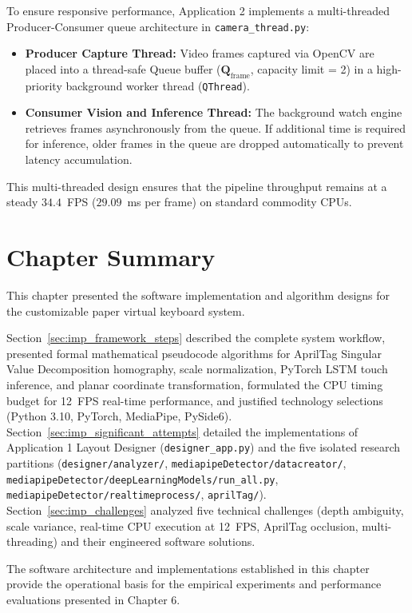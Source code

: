 To ensure responsive performance, Application 2 implements a multi-threaded Producer-Consumer queue architecture in \texttt{camera\_thread.py}:
\begin{itemize}
    \item \textbf{Producer Capture Thread:} Video frames captured via OpenCV are placed into a thread-safe Queue buffer ($\mathbf{Q}_{\text{frame}}$, capacity limit = 2) in a high-priority background worker thread (\texttt{QThread}).
    \item \textbf{Consumer Vision and Inference Thread:} The background watch engine retrieves frames asynchronously from the queue. If additional time is required for inference, older frames in the queue are dropped automatically to prevent latency accumulation.
\end{itemize}

This multi-threaded design ensures that the pipeline throughput remains at a steady $34.4$~FPS ($29.09$~ms per frame) on standard commodity CPUs.

\section{Chapter Summary}
\label{sec:imp_summary}
This chapter presented the software implementation and algorithm designs for the customizable paper virtual keyboard system.

Section~\ref{sec:imp_framework_steps} described the complete system workflow, presented formal mathematical pseudocode algorithms for AprilTag Singular Value Decomposition homography, scale normalization, PyTorch LSTM touch inference, and planar coordinate transformation, formulated the CPU timing budget for 12~FPS real-time performance, and justified technology selections (Python 3.10, PyTorch, MediaPipe, PySide6). Section~\ref{sec:imp_significant_attempts} detailed the implementations of Application 1 Layout Designer (\texttt{designer\_app.py}) and the five isolated research partitions (\texttt{designer/analyzer/}, \texttt{mediapipeDetector/datacreator/}, \texttt{mediapipeDetector/deepLearningModels/run\_all.py}, \texttt{mediapipeDetector/realtimeprocess/}, \texttt{aprilTag/}). Section~\ref{sec:imp_challenges} analyzed five technical challenges (depth ambiguity, scale variance, real-time CPU execution at 12~FPS, AprilTag occlusion, multi-threading) and their engineered software solutions.

The software architecture and implementations established in this chapter provide the operational basis for the empirical experiments and performance evaluations presented in Chapter 6.
